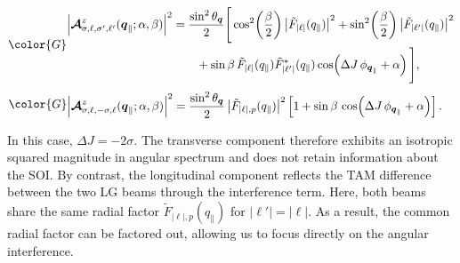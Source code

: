 \noindent
{} %
\begin{equation}
\color{G} 
\begin{aligned}
\left|
\boldsymbol{\mathcal{A}}_{\sigma, \ell, \sigma', \ell'}^z(\boldsymbol{q}_\parallel;\alpha,\beta)
\right|^2
&=
\frac{\sin^2\theta_{\boldsymbol{q}}}{2}
\Bigg[
\cos^2\!\left(\frac{\beta}{2}\right)
\left|\tilde{F}_{\left|\ell\right|}(q_\parallel)\right|^2
+
\sin^2\!\left(\frac{\beta}{2}\right)
\left|\tilde{F}_{\left|\ell'\right|}(q_\parallel)\right|^2 \\ 
&\qquad+
\sin\beta\,
\tilde{F}_{\left|\ell\right|}(q_\parallel)\tilde{F}^{*}_{\left|\ell'\right|}(q_\parallel)
\cos\!\left(\Delta J\,\phi_{\boldsymbol{q}_\parallel}+\alpha\right)
\Bigg],
\end{aligned}
\label{VVBlongi} 
\end{equation}
\begin{equation}
\color{G}
\begin{aligned}
\left|
\boldsymbol{\mathcal{A}}_{\sigma, \ell, -\sigma, \ell}^z(\boldsymbol{q}_\parallel;\alpha,\beta)
\right|^2
&=
\frac{\sin^2\theta_{\boldsymbol{q}}}{2}
\left|\tilde{F}_{\left|\ell\right|, p}(q_\parallel)\right|^2
\left[
1+\sin\beta \,
\cos\!\left(\Delta J\,\phi_{\boldsymbol{q}_\parallel}+\alpha\right)
\right].
\end{aligned}
\label{VVBlongi-simple}
\end{equation}

In this case, $\Delta J=-2\sigma$. The transverse component therefore exhibits an isotropic squared magnitude in angular spectrum and does not retain information about the SOI. By contrast, the longitudinal component reflects the TAM difference between the two LG beams through the interference term. Here, both beams share the same radial factor $\tilde{F}_{\left|\ell\right|, p}(q_\parallel)$ for $|\ell'|=|\ell|$. As a result, the common radial factor can be factored out, allowing us to focus directly on the angular interference. 

